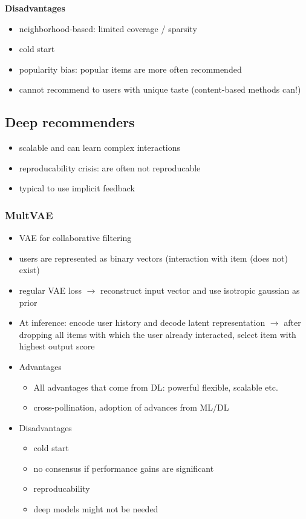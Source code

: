 \textbf{Disadvantages}
\begin{itemize}
    \item neighborhood-based: limited coverage / sparsity
    \item cold start
    \item popularity bias: popular items are more often recommended
    \item cannot recommend to users with unique taste (content-based methods can!)
\end{itemize}
\subsection{Deep recommenders}
\begin{itemize}
    \item scalable and can learn complex interactions
    \item reproducability crisis: are often not reproducable
    \item typical to use implicit feedback
\end{itemize}
\subsubsection{MultVAE}
\begin{itemize}
    \item VAE for collaborative filtering
    \item users are represented as binary vectors (interaction with item (does not) exist)
    \item regular VAE loss $\rightarrow$ reconstruct input vector and use isotropic gaussian as prior
    \item At inference: encode user history and decode latent representation $\rightarrow$ after dropping all items with which the user already interacted, select item with highest output score
    \item Advantages
    \begin{itemize}
        \item All advantages that come from DL: powerful flexible, scalable etc.
        \item cross-pollination, adoption of advances from ML/DL
    \end{itemize}
    \item Disadvantages
    \begin{itemize}
        \item cold start
        \item no consensus if performance gains are significant
        \item reproducability
        \item deep models might not be needed
    \end{itemize}
\end{itemize}
